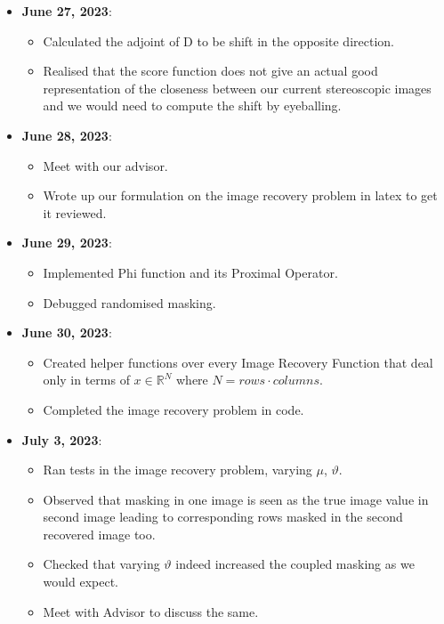 \documentclass[a4paper,11pt,fleqn]{article}
\theoremstyle{plain}{\theorembodyfont{\rmfamily}%
\newtheorem{conjecture}[theorem]{Conjecture}}
\theoremstyle{plain}{\theorembodyfont{\rmfamily}%
\newtheorem{example}[theorem]{Example}}
\theoremstyle{plain}{\theorembodyfont{\rmfamily}%
\newtheorem{remark}[theorem]{Remark}}
\theoremstyle{plain}{\theorembodyfont{\rmfamily}%
\newtheorem{algorithm}[theorem]{Algorithm}}
\theoremstyle{plain}{\theorembodyfont{\rmfamily}%
\newtheorem{condition}[theorem]{Condition}}
\theoremstyle{plain}{\theorembodyfont{\rmfamily}%
\newtheorem{definition}[theorem]{Definition}}
\theoremstyle{plain}{\theorembodyfont{\rmfamily}
\newtheorem{fact}[theorem]{Fact}}
\theoremstyle{plain}{\theorembodyfont{\rmfamily}
\newtheorem{problem}[theorem]{Problem}}
\theoremstyle{plain}{\theorembodyfont{\rmfamily}
\newtheorem{notation}[theorem]{Notation}}
\theoremstyle{plain}{\theorembodyfont{\rmfamily}
\newtheorem{project}[theorem]{Project}}
\newcommand{\RR}{\ensuremath{\mathbb{R}}}
\begin{document}
\begin{itemize}
\item {\bf June 27, 2023}:
\begin{itemize} 
\item Calculated the adjoint of D to be shift in the opposite direction.
\item Realised that the score function does not give an actual good representation of the closeness between our current stereoscopic images and we would need to compute the shift by eyeballing.
\end{itemize}

\item {\bf June 28, 2023}:
\begin{itemize} 
\item Meet with our advisor.
\item Wrote up our formulation on the image recovery problem in latex to get it reviewed.
\end{itemize}

\item {\bf June 29, 2023}:
\begin{itemize} 
\item Implemented Phi function and its Proximal Operator.
\item Debugged randomised masking.
\end{itemize}

\item {\bf June 30, 2023}:
\begin{itemize} 
\item Created helper functions over every Image Recovery Function that deal only in terms of $x \in \RR^N$ where $N = rows \cdot columns$.
\item Completed the image recovery problem in code.
\end{itemize}

\item {\bf July 3, 2023}:
\begin{itemize} 
\item Ran tests in the image recovery problem, varying $\mu$, $\vartheta$.
\item Observed that masking in one image is seen as the true image value in second image leading to corresponding rows masked in the second recovered image too.
\item Checked that varying $\vartheta$ indeed increased the coupled masking as we would expect.
\item Meet with Advisor to discuss the same.
\end{itemize}


\end{itemize}
\end{document}
